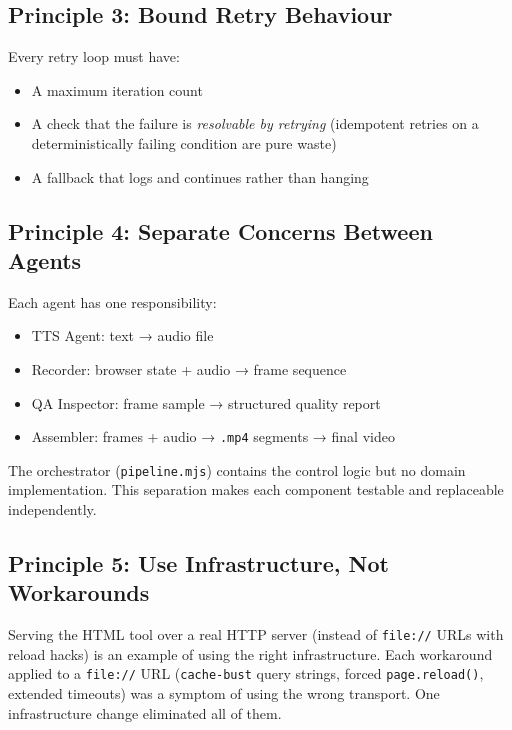 \documentclass[12pt,a4paper]{article}
\begin{document}
\subsection{Principle 3: Bound Retry Behaviour}

Every retry loop must have:
\begin{itemize}[leftmargin=2em]
  \item A maximum iteration count
  \item A check that the failure is \emph{resolvable by retrying} (idempotent
        retries on a deterministically failing condition are pure waste)
  \item A fallback that logs and continues rather than hanging
\end{itemize}

\subsection{Principle 4: Separate Concerns Between Agents}

Each agent has one responsibility:
\begin{itemize}[leftmargin=2em]
  \item TTS Agent: text → audio file
  \item Recorder: browser state + audio → frame sequence
  \item QA Inspector: frame sample → structured quality report
  \item Assembler: frames + audio → \texttt{.mp4} segments → final video
\end{itemize}

The orchestrator (\texttt{pipeline.mjs}) contains the control logic but no
domain implementation. This separation makes each component testable and
replaceable independently.

\subsection{Principle 5: Use Infrastructure, Not Workarounds}

Serving the HTML tool over a real HTTP server (instead of \texttt{file://}
URLs with reload hacks) is an example of using the right infrastructure. Each
workaround applied to a \texttt{file://} URL (\texttt{cache-bust} query strings,
forced \texttt{page.reload()}, extended timeouts) was a symptom of using the
wrong transport. One infrastructure change eliminated all of them.

\end{document}
